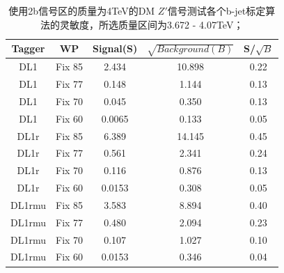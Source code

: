 \begin{table}[ht]
	\begin{center}
		\begin{tabular}{|c|c|c|c|c|}\hline
			Tagger       & WP          & Signal(S)    & $\sqrt{Background(B)}$    & S/$\sqrt{B}$ \\
			\hline
			DL1          & Fix 85      & 2.434      & 10.898        & 0.22        \\
			DL1          & Fix 77      & 0.148      & 1.144         & 0.13        \\
			DL1          & Fix 70      & 0.045      & 0.350         & 0.13        \\
			DL1          & Fix 60      & 0.0065     & 0.133         & 0.05        \\
			\hline
			DL1r          & Fix 85      & 6.389       & 14.145       & 0.45        \\
			DL1r          & Fix 77      & 0.561       & 2.341        & 0.24        \\
			DL1r          & Fix 70      & 0.116       & 0.876        & 0.13        \\
			DL1r          & Fix 60      & 0.0153      & 0.308        & 0.05        \\
			\hline
			DL1rmu          & Fix 85      & 3.583     & 8.894       & 0.40        \\
			DL1rmu          & Fix 77      & 0.480     & 2.094       & 0.23        \\
			DL1rmu          & Fix 70      & 0.107     & 1.027       & 0.10        \\
			DL1rmu          & Fix 60      & 0.0153    & 0.346       & 0.04        \\
			\hline
		\end{tabular}
	\end{center}
	\caption{使用2b信号区的质量为4TeV的DM $Z\prime$信号测试各个b-jet标定算法的灵敏度，所选质量区间为3.672 - 4.07TeV；}
	\label{tab:SenZ4TeV}
\end{table}

